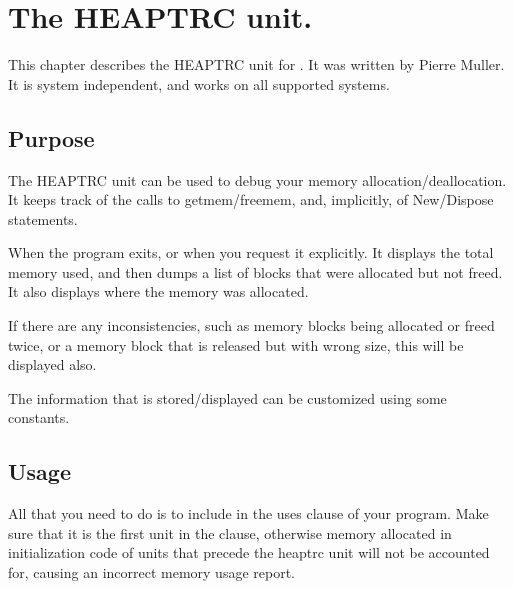 %
%
%
%
%
\chapter{The HEAPTRC unit.}

This chapter describes the HEAPTRC unit for \fpc. It was written by 
Pierre Muller. It is system independent, and works on all supported systems.

\section{Purpose}

The HEAPTRC unit can be used to debug your memory allocation/deallocation.
It keeps track of the calls to getmem/freemem, and, implicitly, of
New/Dispose statements.

When the program exits, or when you request it explicitly.
It displays the total memory used, and then dumps a list of blocks that
were allocated but not freed. It also displays where the memory was
allocated.

If there are any inconsistencies, such as memory blocks being allocated
or freed twice, or a memory block that is released but with wrong size,
this will be displayed also.

The information that is stored/displayed can be customized using
some constants.


\section{Usage}

All that you need to do is to include  in the uses clause
of your program. Make sure that it is the first unit in the clause,
otherwise memory allocated in initialization code of units that precede the
heaptrc unit will not be accounted for, causing an incorrect memory usage
report.

